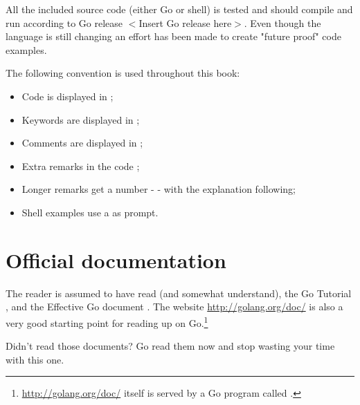 All the included source code (either Go or shell) is tested
and should compile and run according to Go release $<$Insert Go release
here$>$. Even though the language is still changing an effort has been
made to create "future proof" code examples.

The following convention is used throughout this book:
\begin{itemize}
\item Code is displayed in ;
\item Keywords are displayed in ;
\item Comments are displayed in ;
\item Extra remarks in the code ;
\item Longer remarks get a number -  - with the explanation following;
\item Shell examples use a \pr{} as prompt.
\end{itemize}

\section{Official documentation}
The reader is assumed to have read (and somewhat understand), the
Go Tutorial \cite{go_tutorial}, and the Effective Go
document \cite{effective_go}. The
website \url{http://golang.org/doc/} is also a very good starting point
for reading up on Go.\footnote{\url{http://golang.org/doc/} itself is served by 
a Go program called .}

\begin{lbar}
\noindent Didn't read those documents? Go read them now and stop wasting your time
with this one.
\end{lbar}

